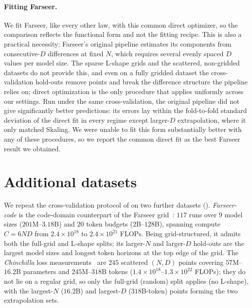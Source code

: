 \documentclass[]{fairmeta}
\newcommand{\ska}{Skaling}
\begin{document}
\paragraph{Fitting Farseer.} We fit Farseer, like every other law, with this common direct optimizer, so the comparison reflects the functional form and not the fitting recipe. This is also a practical necessity: Farseer's original pipeline estimates its components from consecutive-$D$ differences at fixed $N$, which requires several evenly spaced $D$ values per model size. The sparse L-shape grids and the scattered, non-gridded datasets do not provide this, and even on a fully gridded dataset the cross-validation hold-outs remove points and break the difference structure the pipeline relies on; direct optimization is the only procedure that applies uniformly across our settings. Run under the same cross-validation, the original pipeline did not give significantly better predictions: its errors lay within the fold-to-fold standard deviation of the direct fit in every regime except larger-$D$ extrapolation, where it only matched \ska{}. We were unable to fit this form substantially better with any of these procedures, so we report the common direct fit as the best Farseer result we obtained.

\section{Additional datasets}
\label{app:extra_datasets}
We repeat the cross-validation protocol of  on two further datasets (). \emph{Farseer-code} is the code-domain counterpart of the Farseer grid~\citep{li2025predictable}: $117$ runs over $9$ model sizes ($201$M--$3.18$B) and $20$ token budgets ($2$B--$128$B), spanning compute $C{=}6ND$ from $2.4\times10^{18}$ to $2.4\times10^{21}$ FLOPs. Being grid-structured, it admits both the full-grid and L-shape splits; its larger-$N$ and larger-$D$ hold-outs are the largest model sizes and longest token horizons at the top edge of the grid. The \emph{Chinchilla} loss measurements~\citep{besiroglu2024chinchilla} are $245$ scattered $(N,D)$ points covering $57$M--$16.2$B parameters and $245$M--$318$B tokens ($1.4\times10^{18}$--$1.3\times10^{22}$ FLOPs); they do not lie on a regular grid, so only the full-grid (random) split applies (no L-shape), with the largest-$N$ ($16.2$B) and largest-$D$ ($318$B-token) points forming the two extrapolation sets.
\end{document}
